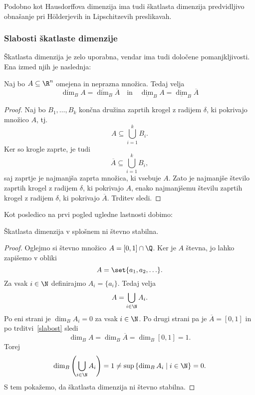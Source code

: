 Podobno kot Hausdorffova dimenzija ima tudi škatlasta dimenzija predvidljivo obnašanje pri H\"olderjevih in Lipschitzevih preslikavah.


\subsubsection{Slabosti škatlaste dimenzije}
Škatlasta dimenzija je zelo uporabna, vendar ima tudi določene pomanjkljivosti. Ena izmed njih je naslednja:

\begin{trditev}
    \label{slabost}
    Naj bo \(A \subseteq \R^n\) omejena in neprazna množica. Tedaj velja 
    \[
        \overline{\dim}_B A = \overline{\dim}_B \overline{A} \quad \text{in} \quad \underline{\dim}_B A = \underline{\dim}_B \overline{A}
    \]
\end{trditev}

\begin{proof}
    Naj bo \(B_1, \ldots, B_k\) končna družina zaprtih krogel z radijem \(\delta\), ki pokrivajo množico \(A\), tj.
    \[
        A \subseteq \bigcup_{i=1}^k B_i.
    \]
    Ker so krogle zaprte, je tudi 
    \[
        \overline{A} \subseteq \bigcup_{i=1}^k B_i,
    \]
    saj zaprtje je najmanjša zaprta množica, ki vsebuje \(A\). Zato je najmanjše število zaprtih krogel z radijem \(\delta\), ki pokrivajo \(A\), enako najmanjšemu številu zaprtih krogel z radijem \(\delta\), ki pokrivajo \(\overline{A}\). Trditev sledi.
\end{proof}

Kot posledico na prvi pogled ugledne lastnosti dobimo:
\begin{posledica}
    Škatlasta dimenzija v splošnem ni števno stabilna.
\end{posledica}

\begin{proof}
    Oglejmo si števno množico \(A = [0, 1] \cap \Q\).
    Ker je \(A\) števna, jo lahko zapišemo v obliki
    \[A = \set{a_1, a_2, \ldots}.\]
    Za vsak \(i \in \N\) definirajmo \(A_i = \{a_i\}\). Tedaj velja
    \[
        A = \bigcup_{i \in \N} A_i.
    \]
    Po eni strani je \(\dim_B A_i = 0\) za vsak \(i \in \N\). Po drugi strani pa je \(\overline{A} = [0, 1]\) in po trditvi~\ref{slabost} sledi
    \[
        \dim_B A = \dim_B \overline{A} = \dim_B [0, 1] = 1.
    \]
    Torej
    \[
        \dim_B\left( \bigcup_{i \in \N} A_i \right) = 1 \neq \sup\left\{ \dim_B A_i \mid i \in \N \right\} = 0.
    \]
    S tem pokažemo, da škatlasta dimenzija ni števno stabilna.
\end{proof}

